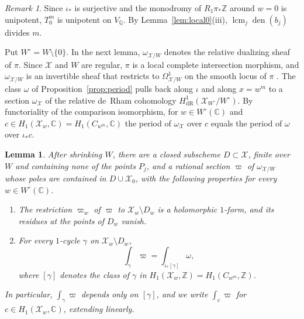 \documentclass[11pt]{amsart}
\newtheorem{lemma}[theorem]{Lemma}
\theoremstyle{definition}
\theoremstyle{remark}
\newtheorem{remark}[theorem]{Remark}
\numberwithin{equation}{section}
\newcommand{\Q}{\mathbb{Q}}
\newcommand{\Z}{\mathbb{Z}}
\newcommand{\C}{\mathbb{C}}
\newcommand{\cX}{\mathcal{X}}
\begin{document}
\begin{remark}\label{rem:m}
Since $\iota_*$ is surjective and the monodromy of $R_1\pi_*\Z$ around $w=0$ is unipotent, $T_0^m$ is unipotent on $V_\Q$. By Lemma~\ref{lem:local0}(iii), $\operatorname{lcm}_j\operatorname{den}(b_j)$ divides $m$.
\end{remark}

Put $W^\circ=W\setminus\{0\}$. In the next lemma, $\omega_{\cX/W}$ denotes the relative dualizing sheaf of $\pi$. Since $\cX$ and $W$ are regular, $\pi$ is a local complete intersection morphism, and $\omega_{\cX/W}$ is an invertible sheaf that restricts to $\Omega^1_{\cX/W}$ on the smooth locus of $\pi$ \citep[\S1, pp.~76--77]{DeligneMumford1969}. The class $\omega$ of Proposition~\ref{prop:period} pulls back along $\iota$ and along $x=w^m$ to a section $\omega_\cX$ of the relative de~Rham cohomology $H^1_{\mathrm{dR}}(\cX_{W^\circ}/W^\circ)$. By functoriality of the comparison isomorphism, for $w\in W^\circ(\C)$ and $c\in H_1(\cX_w,\C)=H_1(C_{w^m},\C)$ the period of $\omega_\cX$ over $c$ equals the period of $\omega$ over $\iota_*c$.

\begin{lemma}\label{lem:eta}
After shrinking $W$, there are a closed subscheme $D\subset\cX$, finite over $W$ and containing none of the points $P_j$, and a rational section $\varpi$ of $\omega_{\cX/W}$ whose poles are contained in $D\cup\cX_0$, with the following properties for every $w\in W^\circ(\C)$.
\begin{enumerate}[label=\textup{(\roman*)},leftmargin=2em]
\item The restriction $\varpi_w$ of $\varpi$ to $\cX_w\setminus D_w$ is a holomorphic $1$-form, and its residues at the points of $D_w$ vanish.
\item For every $1$-cycle $\gamma$ on $\cX_w\setminus D_w$,
\[
\int_\gamma\varpi=\int_{\iota_*[\gamma]}\omega ,
\]
where $[\gamma]$ denotes the class of $\gamma$ in $H_1(\cX_w,\Z)=H_1(C_{w^m},\Z)$.
\end{enumerate}
In particular, $\int_\gamma\varpi$ depends only on $[\gamma]$, and we write $\int_c\varpi$ for $c\in H_1(\cX_w,\C)$, extending linearly.
\end{lemma}
\end{document}
